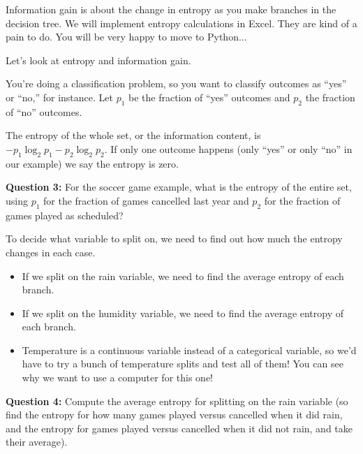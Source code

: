 \documentclass[10pt]{article}
\begin{document}
Information gain is about the change in entropy as you make branches in the decision tree.
We will implement entropy calculations in Excel. They are kind of a pain to do. You will be very happy to move to Python...
\medskip

Let's look at entropy and information gain. 

You're doing a classification problem, so you want to classify outcomes as ``yes'' or ``no,'' for instance. Let $p_1$ be the fraction of ``yes'' outcomes and $p_2$ the fraction of ``no'' outcomes.

The entropy of the whole set, or the information content, is $-p_1 \log_2 p_1- p_2 \log_2 p_2$.
If only one outcome happens (only ``yes'' or only ``no'' in our example) we say the entropy is zero. 
\bigskip

\textbf{Question 3:} For the soccer game example, what is the entropy of the entire set, using $p_1$ for the fraction of games cancelled last year and $p_2$ for the fraction of games played as scheduled?

\vspace{1.5in}





To decide what variable to split on, we need to find out how much the entropy changes in each case. 
\begin{itemize}
\item If we split on the rain variable, we need to find the average entropy of each branch.
\item If we split on the humidity variable, we need to find the average entropy of each branch.
\item Temperature is a continuous variable instead of a categorical variable, so we'd have to try a bunch of temperature splits and test all of them! You can see why we want to use a computer for this one!
\end{itemize}
\textbf{Question 4:} Compute the average entropy for splitting on the rain variable (so find the entropy for how many games played versus cancelled when it did rain, and the entropy for games played versus cancelled when it did not rain, and take their average).


\vfill

\pagebreak
\end{document}

